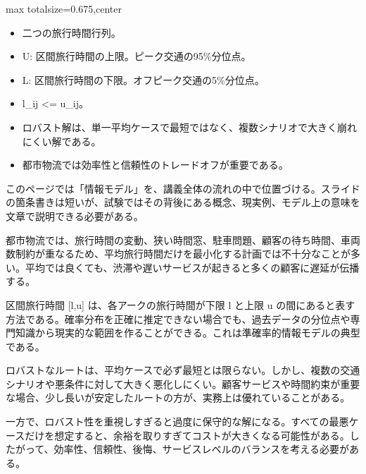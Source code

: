 \clearpage
{}
\begin{adjustbox}{max totalsize={\textwidth}{0.675\textheight},center}
\begin{minipage}{\textwidth}\scriptsize
\begin{minipage}[t]{0.485\textwidth}
\begin{itemize}
\item 二つの旅行時間行列。
\item U: 区間旅行時間の上限。ピーク交通の95\%分位点。
\item L: 区間旅行時間の下限。オフピーク交通の5\%分位点。
\item l\_ij <= u\_ij。
\end{itemize}
\begin{itemize}
\item ロバスト解は、単一平均ケースで最短ではなく、複数シナリオで大きく崩れにくい解である。
\item 都市物流では効率性と信頼性のトレードオフが重要である。
\end{itemize}
\end{minipage}\hfill
\begin{minipage}[t]{0.485\textwidth}
このページでは「情報モデル」を、講義全体の流れの中で位置づける。スライドの箇条書きは短いが、試験ではその背後にある概念、現実例、モデル上の意味を文章で説明できる必要がある。\par
都市物流では、旅行時間の変動、狭い時間窓、駐車問題、顧客の待ち時間、車両数制約が重なるため、平均旅行時間だけを最小化する計画では不十分なことが多い。平均では良くても、渋滞や遅いサービスが起きると多くの顧客に遅延が伝播する。\par
区間旅行時間 [l,u] は、各アークの旅行時間が下限 l と上限 u の間にあると表す方法である。確率分布を正確に推定できない場合でも、過去データの分位点や専門知識から現実的な範囲を作ることができる。これは準確率的情報モデルの典型である。\par
ロバストなルートは、平均ケースで必ず最短とは限らない。しかし、複数の交通シナリオや悪条件に対して大きく悪化しにくい。顧客サービスや時間約束が重要な場合、少し長いが安定したルートの方が、実務上は優れていることがある。\par
一方で、ロバスト性を重視しすぎると過度に保守的な解になる。すべての最悪ケースだけを想定すると、余裕を取りすぎてコストが大きくなる可能性がある。したがって、効率性、信頼性、後悔、サービスレベルのバランスを考える必要がある。\par

\end{minipage}
\end{minipage}
\end{adjustbox}
